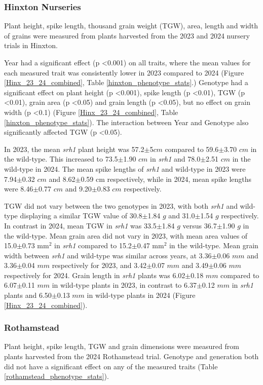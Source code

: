 \documentclass{article}
\begin{document}
\subsubsection{Hinxton Nurseries}

Plant height, spike length, thousand grain weight (TGW), area, length and
width of grains were measured from plants harvested from the 2023 and 2024
nursery trials in Hinxton.

Year had a significant effect (p \textless 0.001) on all traits, where the mean values
for each measured trait was consistently lower in 2023 compared to 2024 (Figure
\ref{Hinx_23_24_combined}, Table \ref{hinxton_phenotype_stats}.) Genotype had
a significant effect on plant height (p \textless 0.001), spike length (p \textless 0.01), TGW
(p \textless 0.01), grain area (p \textless 0.05) and grain length (p \textless 0.05), but no effect
on grain width (p \textless 0.1) (Figure \ref{Hinx_23_24_combined}, Table \ref{hinxton_phenotype_stats}).
The interaction between Year and Genotype also significantly affected TGW (p
\textless 0.05).

In 2023, the mean \textit{srh1} plant height was 57.2$\pm$5$cm$ compared to 59.6$\pm$3.70
$cm$ in the wild-type. This increased to 73.5$\pm$1.90 $cm$ in \textit{srh1} and
78.0$\pm$2.51 $cm$ in the wild-type in 2024. The mean spike lengths of \textit{srh1}
and wild-type in 2023 were 7.94$\pm$0.32 $cm$ and 8.62$\pm$0.59 cm
respectively, while in 2024, mean spike lengths were 8.46$\pm$0.77 $cm$ and
9.20$\pm$0.83 $cm$ respectively.

TGW did not vary between the two genotypes in 2023, with both \textit{srh1}
and wild-type displaying a similar TGW value of 30.8$\pm$1.84 $g$ and 31.0$\pm$1.54
$g$ respectively. In contrast in 2024, mean TGW in \textit{srh1} was 33.5$\pm$1.84
$g$ versus 36.7$\pm$1.90 $g$ in the wild-type. Mean grain area did not vary in
2023, with mean area values of 15.0$\pm$0.73 mm$^{2}$ in \textit{srh1} compared
to 15.2$\pm$0.47 mm$^{2}$ in the wild-type. Mean grain width between \textit{srh1}
and wild-type was similar across years, at 3.36$\pm$0.06 $mm$ and 3.36$\pm$0.04
$mm$ respectively for 2023, and 3.42$\pm$0.07 $mm$ and 3.49$\pm$0.06 $mm$
respectively for 2024. Grain length in \textit{srh1} plants was 6.02$\pm$0.18
$mm$ compared to 6.07$\pm$0.11 $mm$ in wild-type plants in 2023, in contrast to
6.37$\pm$0.12 $mm$ in \textit{srh1} plants and 6.50$\pm$0.13 $mm$ in wild-type plants
in 2024 (Figure \ref{Hinx_23_24_combined}).

\subsubsection{Rothamstead}
Plant height, spike length, TGW and grain dimensions were measured from
plants harvested from the 2024 Rothamstead trial. Genotype and generation both
did not have a significant effect on any of the measured traits (Table
\ref{rothamstead_phenotype_stats}).
\end{document}

